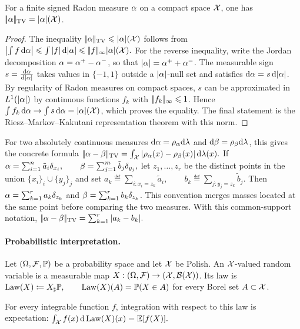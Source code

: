 \begin{prop}\label{prop-tv-dual-measure}
For a finite signed Radon measure $\alpha$ on a compact space $\mathcal{X}$,
one has $|\!| \alpha |\!|_{\operatorname{TV}}=|\alpha|(\mathcal{X})$.
\end{prop}
\begin{proof}
The inequality $|\!| \alpha |\!|_{\operatorname{TV}}\leqslant |\alpha|(\mathcal{X})$ follows from
\(\left\lvert\int f\,\mathrm{d}\alpha\right\rvert\leqslant \int |f|\,\mathrm{d}|\alpha|\leqslant |\!| f |\!|_\infty |\alpha|(\mathcal{X}).\)
For the reverse inequality, write the Jordan decomposition $\alpha=\alpha^+-\alpha^-$, so that $|\alpha|=\alpha^++\alpha^-$. The measurable sign $s=\frac{\mathrm{d}\alpha}{\mathrm{d}|\alpha|}$ takes values in $\{-1,1\}$ outside a $|\alpha|$-null set and satisfies $\mathrm{d}\alpha=s\,\mathrm{d}|\alpha|$. By regularity of Radon measures on compact spaces, $s$ can be approximated in $L^1(|\alpha|)$ by continuous functions $f_k$ with $|\!| f_k |\!|_\infty\leqslant1$. Hence $\int f_k\,\mathrm{d}\alpha\to\int s\,\mathrm{d}\alpha=|\alpha|(\mathcal{X})$, which proves the equality. The final statement is the Riesz--Markov--Kakutani representation theorem with this norm.
\end{proof}
For two absolutely continuous measures $\mathrm{d}\alpha=\rho_{\alpha}\mathrm{d}\lambda$ and $\mathrm{d}\beta=\rho_{\beta}\mathrm{d}\lambda$, this gives the concrete formula
\(|\!| \alpha-\beta |\!|_{\operatorname{TV}} = \int_{\mathcal{X}} |\rho_{\alpha}(x)-\rho_{\beta}(x)|\,\mathrm{d}\lambda(x).\)
If
\(\alpha=\sum_{i=1}^n \tilde a_i\delta_{x_i}, \qquad \beta=\sum_{j=1}^m \tilde b_j\delta_{y_j},\)
let $z_1,\ldots,z_r$ be the distinct points in the union $\{x_i\}_i\cup\{y_j\}_j$ and set
\(a_k\eqdef\sum_{i:x_i=z_k}\tilde a_i, \qquad b_k\eqdef\sum_{j:y_j=z_k}\tilde b_j.\)
Then $\alpha=\sum_{k=1}^r a_k\delta_{z_k}$ and $\beta=\sum_{k=1}^r b_k\delta_{z_k}$. This convention merges masses located at the same point before comparing the two measures. With this common-support notation,
\(|\!| \alpha-\beta |\!|_{\operatorname{TV}} = \sum_{k=1}^r |a_k-b_k|.\)
\paragraph{Probabilistic interpretation.}
\begin{defn}\label{def-random-variable-law}
Let $(\Omega,\mathcal{F},\mathbb{P})$ be a probability space and let $\mathcal{X}$ be Polish. An $\mathcal{X}$-valued random variable is a measurable map $X:(\Omega,\mathcal{F})\to(\mathcal{X},\mathcal{B}(\mathcal{X}))$. Its law is
\(\operatorname{Law}(X)\coloneqq X_\sharp\mathbb{P}, \qquad \operatorname{Law}(X)(A)=\mathbb{P}(X\in A)\)
for every Borel set $A\subset\mathcal{X}$.
\end{defn}
For every integrable function $f$, integration with respect to this law is expectation: \(\int_{\mathcal{X}} f(x)\,\mathrm{d}\operatorname{Law}(X)(x)=\mathbb{E}[f(X)].\)

